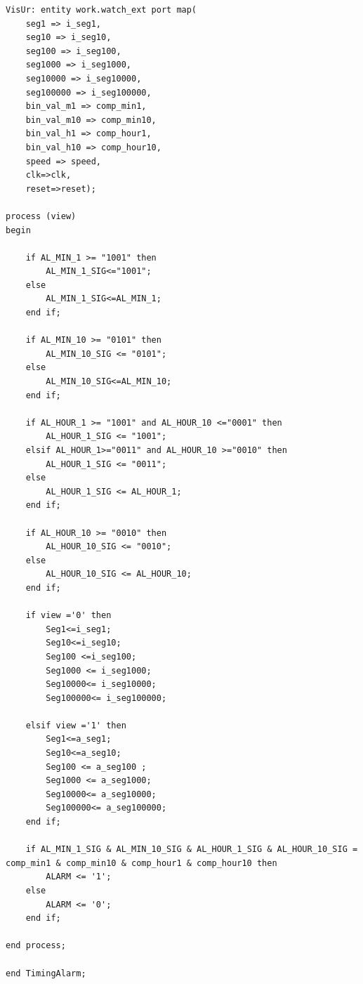 \begin{enumerate}
\begin{lstlisting}[caption={Koden for øverste lag af Alarm Watch},label={lst:alarmWatch}]
VisUr: entity work.watch_ext port map(
	seg1 => i_seg1, 
	seg10 => i_seg10, 
	seg100 => i_seg100, 
	seg1000 => i_seg1000, 
	seg10000 => i_seg10000, 
	seg100000 => i_seg100000,
	bin_val_m1 => comp_min1,
	bin_val_m10 => comp_min10,
	bin_val_h1 => comp_hour1,
	bin_val_h10 => comp_hour10,
	speed => speed,
	clk=>clk,
	reset=>reset);

process (view)
begin 

	if AL_MIN_1 >= "1001" then
		AL_MIN_1_SIG<="1001";
	else 
		AL_MIN_1_SIG<=AL_MIN_1;
	end if;
	
	if AL_MIN_10 >= "0101" then
		AL_MIN_10_SIG <= "0101";
	else 
		AL_MIN_10_SIG<=AL_MIN_10;
	end if;
	
	if AL_HOUR_1 >= "1001" and AL_HOUR_10 <="0001" then
		AL_HOUR_1_SIG <= "1001";
	elsif AL_HOUR_1>="0011" and AL_HOUR_10 >="0010" then
		AL_HOUR_1_SIG <= "0011";
	else
		AL_HOUR_1_SIG <= AL_HOUR_1;
	end if;
	
	if AL_HOUR_10 >= "0010" then
		AL_HOUR_10_SIG <= "0010";
	else
		AL_HOUR_10_SIG <= AL_HOUR_10;
	end if;
	
	if view ='0' then
		Seg1<=i_seg1;
		Seg10<=i_seg10;
		Seg100 <=i_seg100;
		Seg1000 <= i_seg1000;
		Seg10000<= i_seg10000;
		Seg100000<= i_seg100000;
	
	elsif view ='1' then
		Seg1<=a_seg1;
		Seg10<=a_seg10;
		Seg100 <= a_seg100 ;
		Seg1000 <= a_seg1000;
		Seg10000<= a_seg10000;
		Seg100000<= a_seg100000;
	end if;
	
	if AL_MIN_1_SIG & AL_MIN_10_SIG & AL_HOUR_1_SIG & AL_HOUR_10_SIG = comp_min1 & comp_min10 & comp_hour1 & comp_hour10 then
		ALARM <= '1';
	else
		ALARM <= '0';
	end if;
	
end process;

end TimingAlarm;

\end{lstlisting}

\end{enumerate}
	